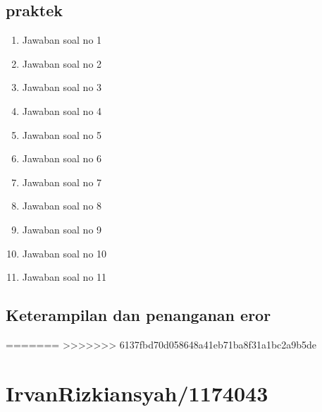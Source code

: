 \subsection{praktek}
\begin{enumerate}
    \item Jawaban soal no 1
    
    \item Jawaban soal no 2
    
    \item Jawaban soal no 3
    
    \item Jawaban soal no 4
    
    \item Jawaban soal no 5
    
    \item Jawaban soal no 6
    
    \item Jawaban soal no 7
    
    \item Jawaban soal no 8
    
    \item Jawaban soal no 9
    
    \item Jawaban soal no 10
    
    \item Jawaban soal no 11
    
\end{enumerate}

\subsection{Keterampilan dan penanganan eror}
    


=======
>>>>>>> 6137fbd70d058648a41eb71ba8f31a1bc2a9b5de
\section{IrvanRizkiansyah/1174043}
